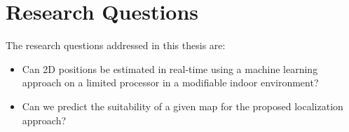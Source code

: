 \section{Research Questions}
\label{sec:researchquestions}

The research questions addressed in this thesis are:

\begin{itemize}
\item Can 2D positions be estimated in real-time using a machine
  learning approach on a limited processor in a modifiable indoor
  environment?
\item Can we predict the suitability of a given map for the proposed
  localization approach?
\end{itemize}